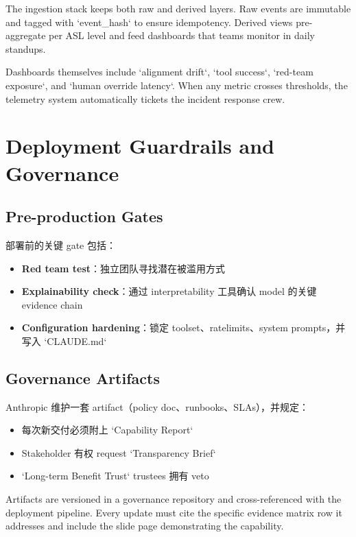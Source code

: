 \documentclass[a4paper]{article}
\begin{document}
The ingestion stack keeps both raw and derived layers. Raw events are immutable and tagged with `event\_hash` to ensure idempotency. Derived views pre-aggregate per ASL level and feed dashboards that teams monitor in daily standups.

Dashboards themselves include `alignment drift`, `tool success`, `red-team exposure`, and `human override latency`. When any metric crosses thresholds, the telemetry system automatically tickets the incident response crew.

\section{Deployment Guardrails and Governance}

\subsection{Pre-production Gates}

部署前的关键 gate 包括：

\begin{itemize}
    \item \textbf{Red team test}：独立团队寻找潜在被滥用方式
    \item \textbf{Explainability check}：通过 interpretability 工具确认 model 的关键 evidence chain
    \item \textbf{Configuration hardening}：锁定 toolset、ratelimits、system prompts，并写入 `CLAUDE.md`
\end{itemize}

\subsection{Governance Artifacts}

Anthropic 维护一套 artifact（policy doc、runbooks、SLAs），并规定：

\begin{itemize}
    \item 每次新交付必须附上 `Capability Report`
    \item Stakeholder 有权 request `Transparency Brief`
    \item `Long-term Benefit Trust` trustees 拥有 veto
\end{itemize}

Artifacts are versioned in a governance repository and cross-referenced with the deployment pipeline. Every update must cite the specific evidence matrix row it addresses and include the slide page demonstrating the capability.
\end{document}

